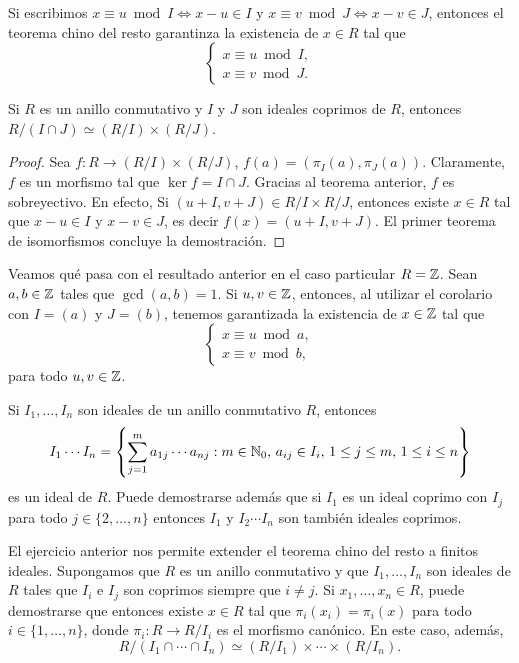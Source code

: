 Si escribimos 
$x\equiv u\bmod I\Longleftrightarrow x-u\in I$ y 
$x\equiv v\bmod J\Longleftrightarrow x-v\in J$, 
entonces el teorema chino del resto garantinza la existencia de $x\in R$ tal que 
\[
\begin{cases}
x\equiv u\bmod I,\\
x\equiv v\bmod J.
\end{cases}
\]

\begin{corollary}
Si $R$ es un anillo conmutativo y $I$ y $J$ son ideales coprimos de $R$, entonces
$R/(I\cap J)\simeq (R/I)\times(R/J)$.	
\end{corollary}

\begin{proof}
Sea $f\colon R\to (R/I)\times (R/J)$, $f(a)=(\pi_I(a),\pi_J(a))$. Claramente, $f$ es un morfismo tal que $\ker f=I\cap J$. 
Gracias al teorema anterior, $f$ es sobreyectivo. En efecto,
Si $(u+I,v+J)\in R/I\times R/J$, entonces existe $x\in R$ tal que $x-u\in I$ y $x-v\in J$, es decir
$f(x)=(u+I,v+J)$. El primer teorema de isomorfismos concluye la demostración.  	
\end{proof}

Veamos qué pasa con el resultado anterior en el caso particular $R=\mathbb{Z}$. 
Sean $a,b\in\mathbb{Z}$ tales que $\gcd(a,b)=1$. Si $u,v\in\mathbb{Z}$, entonces, al utilizar el corolario con $I=(a)$ y $J=(b)$, 
tenemos garantizada la existencia de $x\in\mathbb{Z}$ tal que
\[
\begin{cases}
x\equiv u\bmod a,\\
x\equiv v\bmod b,	
\end{cases}
\]
para todo $u,v\in\mathbb{Z}$. 

\begin{exercise}
Si $I_1,\dots,I_n$ son ideales de un anillo conmutativo $R$, entonces
\[
I_1\cdots I_n=\left\{\sum_{j=1}^m a_{1j}\cdots a_{nj}:m\in\mathbb{N}_0,\,a_{ij}\in I_i,\,1\leq j\leq m,\,1\leq i\leq n\right\}
\]
es un ideal de $R$. Puede demostrarse además que si $I_1$ es un ideal coprimo con $I_j$ para todo $j\in\{2,\dots,n\}$ entonces
$I_1$ y $I_2\cdots I_n$ son también ideales coprimos. 
\end{exercise}

El ejercicio anterior nos permite extender el teorema chino del resto a finitos ideales. Supongamos que $R$ es un anillo conmutativo y que
$I_1,\dots,I_n$ son ideales de $R$ tales que $I_i$ e $I_j$ son coprimos siempre que $i\ne j$. Si $x_1,\dots,x_n\in R$, puede demostrarse que
entonces existe $x\in R$ 
tal que $\pi_i(x_i)=\pi_i(x)$ para todo $i\in\{1,\dots,n\}$, donde $\pi_i\colon R\to R/I_i$ es el morfismo canónico. En este caso, además,
\[
R/(I_1\cap\cdots\cap I_n)\simeq (R/I_1)\times\cdots\times (R/I_n).
\]

